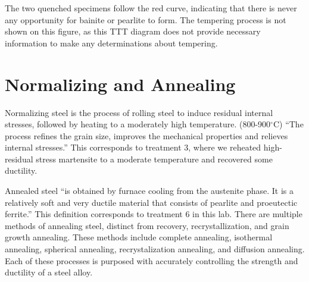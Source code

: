 \documentclass{article}
\begin{document}
The two quenched specimens follow the red curve, indicating that there is never any opportunity for bainite or pearlite to form. The tempering process is not shown on this figure, as this TTT diagram does not provide necessary information to make any determinations about tempering.

\section{Normalizing and Annealing}
Normalizing steel is the process of rolling steel to induce residual internal stresses, followed by heating to a moderately high temperature. (800-900$^\circ$C) \cite{ref:normalize} ``The process refines the grain size, improves the mechanical properties and relieves internal stresses.'' \cite{ref:normalize} This corresponds to treatment 3, where we reheated high-residual stress martensite to a moderate temperature and recovered some ductility.

Annealed steel ``is obtained by furnace cooling from the austenite phase. It is a relatively soft and
very ductile material that consists of pearlite and proeutectic ferrite.'' \cite{book} This definition corresponds to treatment 6 in this lab. There are multiple methods of annealing steel, distinct from recovery, recrystallization, and grain growth annealing. These methods include complete annealing, isothermal annealing, spherical annealing, recrystalization annealing, and diffusion annealing. \cite{ref:anneal} Each of these processes is purposed with accurately controlling the strength and ductility of a steel alloy.

\raggedright


\end{document}
